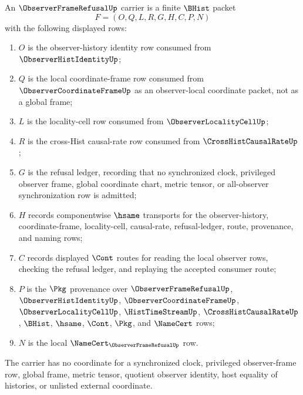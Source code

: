 \begin{definition}
\label{def:observer-frame-refusal-carrier}
An $\ObserverFrameRefusalUp$ carrier is a finite $\BHist$ packet
$$
F=(O,Q,L,R,G,H,C,P,N)
$$
with the following displayed rows:
\begin{enumerate}
\item $O$ is the observer-history identity row consumed from $\ObserverHistIdentityUp$;
\item $Q$ is the local coordinate-frame row consumed from $\ObserverCoordinateFrameUp$ as an observer-local coordinate packet, not as a global frame;
\item $L$ is the locality-cell row consumed from $\ObserverLocalityCellUp$;
\item $R$ is the cross-Hist causal-rate row consumed from $\CrossHistCausalRateUp$;
\item $G$ is the refusal ledger, recording that no synchronized clock, privileged observer frame, global coordinate chart, metric tensor, or all-observer synchronization row is admitted;
\item $H$ records componentwise $\hsame$ transports for the observer-history, coordinate-frame, locality-cell, causal-rate, refusal-ledger, route, provenance, and naming rows;
\item $C$ records displayed $\Cont$ routes for reading the local observer rows, checking the refusal ledger, and replaying the accepted consumer route;
\item $P$ is the $\Pkg$ provenance over $\ObserverFrameRefusalUp$, $\ObserverHistIdentityUp$, $\ObserverCoordinateFrameUp$, $\ObserverLocalityCellUp$, $\HistTimeStreamUp$, $\CrossHistCausalRateUp$, $\BHist$, $\hsame$, $\Cont$, $\Pkg$, and $\NameCert$ rows;
\item $N$ is the local $\NameCert_{\ObserverFrameRefusalUp}$ row.
\end{enumerate}
The carrier has no coordinate for a synchronized clock, privileged observer-frame row, global frame, metric tensor, quotient observer identity, host equality of histories, or unlisted external coordinate.
\end{definition}

